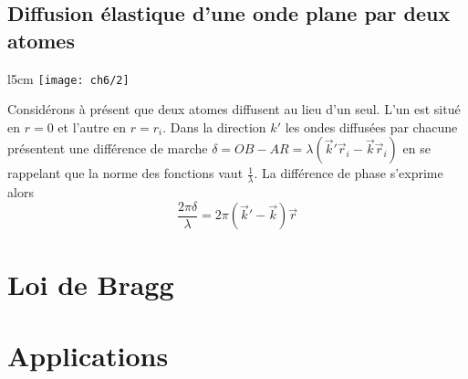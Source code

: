 	\subsection{Diffusion élastique d'une onde plane par deux atomes}
	\begin{wrapfigure}[5]{l}{5cm}
	\vspace{-5mm}
	\texttt{[image: ch6/2]}
	\end{wrapfigure}
	Considérons à présent que deux atomes diffusent au lieu d'un seul. L'un est situé en $r=0$ et l'autre en $r=r_i$. Dans la direction $k'$ les ondes diffusées par chacune présentent une différence de marche $\delta = OB-AR=\lambda (\vec{k}'\vec{r}_i - \vec{k}\vec{r}_i)$ en se rappelant que la norme des fonctions vaut $\frac{1}{\lambda}$. La différence de phase s'exprime alors 
	\begin{equation}
		\frac{2\pi \delta}{\lambda} = 2\pi (\vec{k}'-\vec{k})\vec{r}
	\end{equation}
\section{Loi de Bragg}
\section{Applications}